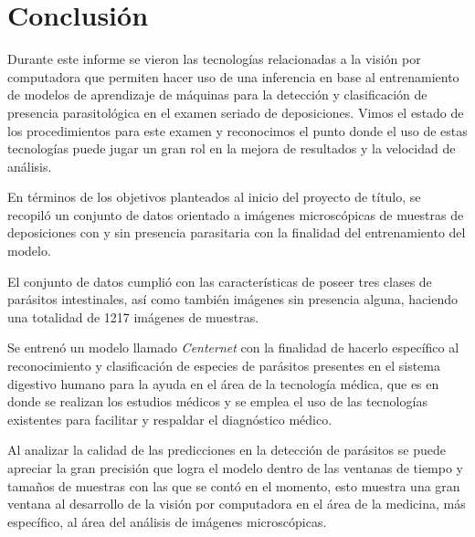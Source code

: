 \documentclass[letter,12pt]{report}
\begin{document}
\chapter{Conclusión}\label{conclusion}
Durante este informe se vieron las tecnologías relacionadas a la visión por computadora
que permiten hacer uso de una inferencia en base al entrenamiento de modelos de
aprendizaje de máquinas para la detección y clasificación de presencia parasitológica en
el examen seriado de deposiciones. Vimos el estado de los procedimientos para este examen
y reconocimos el punto donde el uso de estas tecnologías puede jugar un gran rol en la
mejora de resultados y la velocidad de análisis.

En términos de los objetivos planteados al inicio del proyecto de título, se recopiló un
conjunto de datos orientado a imágenes microscópicas de muestras de deposiciones con y sin
presencia parasitaria con la finalidad del entrenamiento del modelo.

El conjunto de datos cumplió con las características de poseer tres clases de parásitos
intestinales, así como también imágenes sin presencia alguna, haciendo una totalidad de 1217
imágenes de muestras.

Se entrenó un modelo llamado \textit{Centernet} con la finalidad de hacerlo específico al
reconocimiento y clasificación de especies de parásitos presentes en el sistema digestivo
humano para la ayuda en el área de la tecnología médica, que es en donde se realizan los
estudios médicos y se emplea el uso de las tecnologías existentes para facilitar y respaldar
el diagnóstico médico.

Al analizar la calidad de las predicciones en la detección de parásitos se puede apreciar la
gran precisión que logra el modelo dentro de las ventanas de tiempo y tamaños de muestras
con las que se contó en el momento, esto muestra una gran ventana al desarrollo de la visión
por computadora en el área de la medicina, más específico, al área del análisis de imágenes
microscópicas.



\end{document}

